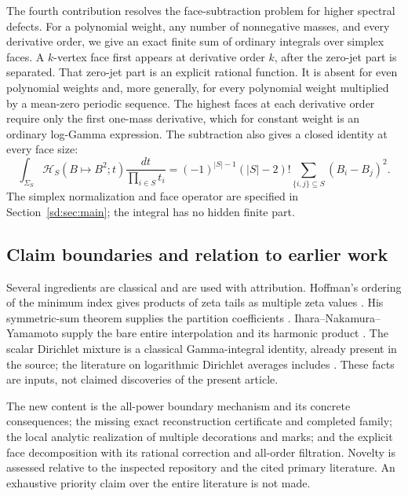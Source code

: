 The fourth contribution resolves the face-subtraction problem for
higher spectral defects. For a polynomial weight, any number of
nonnegative masses, and every derivative order, we give an exact finite
sum of ordinary integrals over simplex faces. A $k$-vertex face first
appears at derivative order $k$, after the zero-jet part is separated.
That zero-jet part is an explicit rational function. It is absent for
even polynomial weights and, more generally, for every polynomial
weight multiplied by a mean-zero periodic sequence. The highest faces
at each derivative order require only the first one-mass derivative,
which for constant weight is an ordinary log-Gamma expression.
The subtraction also gives a closed identity at every face size:
\begin{equation}\label{intro:face}
 \int_{\Sigma_S}\mathcal H_S(B\mapsto B^2;t)
                  \frac{dt}{\prod_{i\in S}t_i}
 =(-1)^{|S|-1}(|S|-2)!
                 \sum_{\{i,j\}\subseteq S}(B_i-B_j)^2.
\end{equation}
The simplex normalization and face operator are specified in
Section~\ref{sd:sec:main}; the integral has no hidden finite part.

\subsection{Claim boundaries and relation to earlier work}

Several ingredients are classical and are used with attribution.
Hoffman's ordering of the minimum index gives products of zeta tails
as multiple zeta values \cite{HoffmanTails}. His symmetric-sum theorem
supplies the partition coefficients \cite{gm:Hoffman1992,gm:Hoffman2018}.
Ihara--Nakamura--Yamamoto supply the bare entire interpolation and its
harmonic product \cite{gm:INY}. The scalar Dirichlet mixture is a
classical Gamma-integral identity, already present in the source; the
literature on logarithmic Dirichlet averages includes
\cite{sd:Carlson1987,sd:Carlson1991}. These facts are inputs, not claimed
discoveries of the present article.

The new content is the all-power boundary mechanism and its concrete
consequences; the missing exact reconstruction certificate and completed
family; the local analytic realization of multiple decorations and
marks; and the explicit face decomposition with its rational correction
and all-order filtration. Novelty is assessed relative to the inspected
repository and the cited primary literature. An exhaustive priority
claim over the entire literature is not made.

